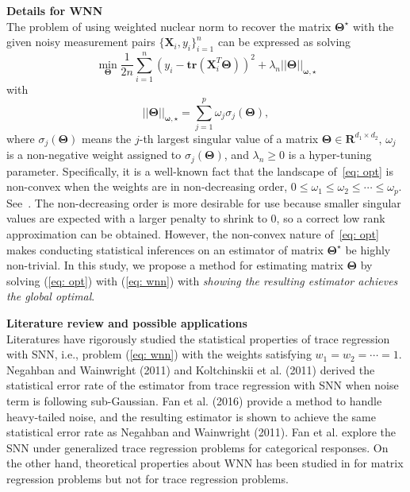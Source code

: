 \documentclass[12pt]{article}
\begin{document}
{\bf Details for WNN}\\
The problem of using  weighted nuclear norm to recover the matrix $\boldsymbol{\Theta^\star}$ with the given noisy measurement pairs $\big\{\mathbf{X}_{i},y_{i}\big\}_{i=1}^{n}$ can be expressed as solving  
\begin{equation} 
    \min_{\boldsymbol{\Theta}} \frac{1}{2n}\sum^{n}_{i=1} (y_{i} - \textbf{tr}(\mathbf{X}^{T}_{i}\boldsymbol{\Theta}))^2 + \lambda_{n} ||\boldsymbol{\Theta}||_{\boldsymbol{\omega,\star}} \label{eq: opt}
\end{equation}
with 
\begin{equation}
    ||\boldsymbol{\Theta}||_{\boldsymbol{\omega,\star}} =\sum^{p}_{j=1} \omega_{j}\sigma_{j}(\boldsymbol{\Theta}), \label{eq: wnn}
\end{equation}
where $\sigma_{j}(\boldsymbol{\Theta})$ means the $j$-th largest singular value of a matrix $\boldsymbol{\Theta} \in \mathbf{R}^{d_{1} \times d_{2}}$, $\omega_{j}$ is a non-negative weight assigned to $\sigma_{j}(\boldsymbol{\Theta})$, and $\lambda_{n}\geq 0$ is a hyper-tuning parameter. 
Specifically, it is a well-known fact that the landscape of~\eqref{eq: opt} is non-convex when the weights are in non-decreasing order, $0\leq\omega_{1}\leq\omega_{2}\leq\cdots\leq\omega_{p}$. 
See~\cite{gu2014weighted,chen2013reduced}.
The non-decreasing order is more desirable for use because smaller singular values are expected with a larger penalty to shrink to 0, so a correct low rank approximation can be obtained. However, the non-convex nature of~\eqref{eq: opt} makes conducting statistical inferences on an estimator of matrix $\boldsymbol{\Theta^\star}$ be highly non-trivial. In this study, we propose a method for estimating matrix $\boldsymbol{\Theta}$ by solving (\ref{eq: opt}) with (\ref{eq: wnn}) with {\it showing the resulting estimator achieves the global optimal}.

{\bf Literature review and possible applications}\\
Literatures have rigorously studied the statistical properties of trace regression with SNN, i.e., problem (\ref{eq: wnn}) with the weights satisfying $w_{1} = w_{2} = \cdots = 1$. Negahban and Wainwright (2011) and Koltchinskii et al. (2011) derived the statistical error rate of the estimator from trace regression with SNN when noise term  is following sub-Gaussian. Fan et al. (2016) provide a method to handle
heavy-tailed noise, and the resulting estimator is shown to achieve the same statistical error rate as Negahban and Wainwright (2011). Fan et al. explore the SNN under generalized trace regression problems for categorical responses. On the other hand, theoretical properties about WNN has been studied in \citet{chen2013reduced} for matrix regression problems but not for trace regression problems. 
\end{document}
